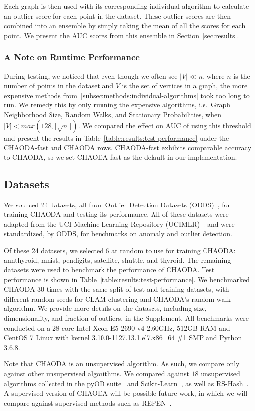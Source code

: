 Each graph is then used with its corresponding individual algorithm to calculate an outlier score for each point in the dataset.
These outlier scores are then combined into an ensemble by simply taking the mean of all the scores for each point.
We present the AUC scores from this ensemble in Section~\ref{sec:results}.

\subsubsection{A Note on Runtime Performance}

During testing, we noticed that even though we often see $|V| \ll n $, where $n$ is the number of points in the dataset and $V$ is the set of vertices in a graph, the more expensive methods from~\ref{subsec:methods:individual-algorithms} took too long to run.
We remedy this by only running the expensive algorithms, i.e.\ Graph Neighborhood Size, Random Walks, and Stationary Probabilities, when $|V| < max(128, \lfloor \sqrt n \rfloor)$.
We compared the effect on AUC of using this threshold and present the results in Table~\ref{table:results:test-performance} under the CHAODA-fast and CHAODA rows.
CHAODA-fast exhibits comparable accuracy to CHAODA, so we
set CHAODA-fast as the default in our implementation.


\subsection{Datasets}
\label{subsec:methods:datasets}

We sourced 24 datasets, all from Outlier Detection Datasets (ODDS)~\cite{rayana2016odds}, for training CHAODA and testing its performance.
All of these datasets were adapted from the UCI Machine Learning Repository (UCIMLR)~\cite{UCIMLR}, and were standardized, by ODDS, for benchmarks on anomaly and outlier detection.

Of these 24 datasets, we selected 6 at random to use for training CHAODA: annthyroid, mnist, pendigits, satellite, shuttle, and thyroid.
The remaining datasets were used to benchmark the performance of CHAODA\@.
Test performance is shown in Table~\ref{table:results:test-performance}.
We benchmarked CHAODA 30 times with the same split of test and training datasets, with different random seeds for CLAM clustering and CHAODA's random walk algorithm.
We provide more details on the datasets, including size, dimensionality, and fraction of outliers, in the Supplement.
All benchmarks were conducted on a 28-core Intel Xeon E5-2690 v4 2.60GHz, 512GB RAM and CentOS 7 Linux with kernel 3.10.0-1127.13.1.el7.x86\_64 \#1 SMP and Python 3.6.8.

Note that CHAODA is an unsupervised algorithm.
As such, we compare only against other unsupervised algorithms.
We compared against $18$ unsupervised algorithms collected in the pyOD suite~\cite{zhao2019pyod} and Scikit-Learn~\cite{pedregosa2011scikit}, as well as RS-Hash~\cite{sathe2016subspace}.
A supervised version of CHAODA will be possible future work, in which we will compare against supervised methods such as REPEN~\cite{pang2018learning}.